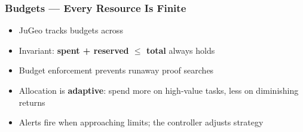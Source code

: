 \begin{frame}
\frametitle{Budgets --- Every Resource Is Finite}
\begin{center}
\end{center}
\vfill
\begin{itemize}
  \item JuGeo tracks budgets across 
  \item Invariant: \textbf{spent + reserved $\leq$ total} always holds
  \item Budget enforcement prevents runaway proof searches
  \item Allocation is \textbf{adaptive}: spend more on high-value tasks,
        less on diminishing returns
  \item Alerts fire when approaching limits; the controller adjusts strategy
\end{itemize}
\end{frame}

